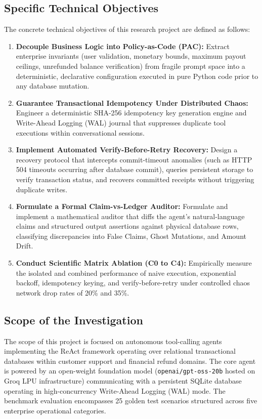 \subsection{Specific Technical Objectives}
The concrete technical objectives of this research project are defined as follows:
\begin{enumerate}
    \item \textbf{Decouple Business Logic into Policy-as-Code (PAC):} Extract enterprise invariants (user validation, monetary bounds, maximum payout ceilings, unrefunded balance verification) from fragile prompt space into a deterministic, declarative configuration executed in pure Python code prior to any database mutation.
    \item \textbf{Guarantee Transactional Idempotency Under Distributed Chaos:} Engineer a deterministic SHA-256 idempotency key generation engine and Write-Ahead Logging (WAL) journal that suppresses duplicate tool executions within conversational sessions.
    \item \textbf{Implement Automated Verify-Before-Retry Recovery:} Design a recovery protocol that intercepts commit-timeout anomalies (such as HTTP 504 timeouts occurring after database commit), queries persistent storage to verify transaction status, and recovers committed receipts without triggering duplicate writes.
    \item \textbf{Formulate a Formal Claim-vs-Ledger Auditor:} Formulate and implement a mathematical auditor that diffs the agent's natural-language claims and structured output assertions against physical database rows, classifying discrepancies into False Claims, Ghost Mutations, and Amount Drift.
    \item \textbf{Conduct Scientific Matrix Ablation (C0 to C4):} Empirically measure the isolated and combined performance of naive execution, exponential backoff, idempotency keying, and verify-before-retry under controlled chaos network drop rates of 20\% and 35\%.
\end{enumerate}

\subsection{Scope of the Investigation}
The scope of this project is focused on autonomous tool-calling agents implementing the ReAct framework operating over relational transactional databases within customer support and financial refund domains. The core agent is powered by an open-weight foundation model (\texttt{openai/gpt-oss-20b} hosted on Groq LPU infrastructure) communicating with a persistent SQLite database operating in high-concurrency Write-Ahead Logging (WAL) mode. The benchmark evaluation encompasses 25 golden test scenarios structured across five enterprise operational categories.


